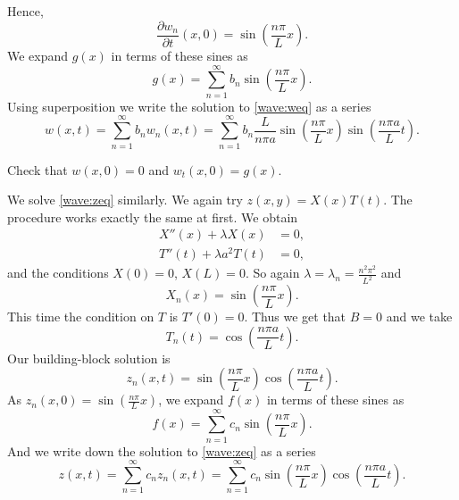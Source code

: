 \documentclass{ximera}
\begin{document}
Hence,
\begin{equation*}
    \frac{\partial w_n}{\partial t}(x,0) = \sin \left( \frac{n \pi}{L} x \right) .
\end{equation*}
We expand $g(x)$ in terms of these sines as
\begin{equation*}
    g(x) = \sum_{n=1}^\infty b_n \sin \left( \frac{n \pi}{L} x \right) .
\end{equation*}
Using superposition we write the solution to \eqref{wave:weq} as a series
\begin{equation*}
    w(x,t) = \sum_{n=1}^\infty b_n w_n(x,t)
    = \sum_{n=1}^\infty b_n \frac{L}{n \pi a} \sin \left( \frac{n \pi}{L} x \right) \sin \left( \frac{n \pi a}{L} t \right) .
\end{equation*}

\begin{exercise}
    Check that $w(x,0) = 0$ and $w_t(x,0) = g(x)$.
\end{exercise}

We solve \eqref{wave:zeq} similarly.  We again try $z(x,y) = X(x)T(t)$.  The procedure works exactly the same at first. We obtain
\begin{align*}
    X''(x) + \lambda X(x) &= 0 , \\
    T''(t) + \lambda a^2 T(t) &= 0 ,
\end{align*}
and the conditions $X(0) = 0$, $X(L) = 0$.  So again $\lambda = \lambda_n = \frac{n^2 \pi^2}{L^2}$ and
\begin{equation*}
    X_n(x) = \sin \left( \frac{n \pi}{L} x \right) .
\end{equation*}
This time the condition on $T$ is $T'(0) = 0$.  Thus  we get that $B = 0$ and we take
\begin{equation*}
    T_n(t) = \cos \left( \frac{n \pi a}{L} t \right).
\end{equation*}
Our building-block solution is
\begin{equation*}
    z_n(x,t) =  \sin \left( \frac{n \pi}{L} x \right) \cos \left( \frac{n \pi a}{L} t \right) .
\end{equation*}
As $z_n(x,0) = \sin \left( \frac{n \pi}{L} x \right)$, we expand $f(x)$ in terms of these sines as
\begin{equation*}
    f(x) = \sum_{n=1}^\infty c_n \sin \left( \frac{n \pi}{L} x \right) .
\end{equation*}
And we write down the solution to \eqref{wave:zeq} as a series
\begin{equation*}
    z(x,t) = \sum_{n=1}^\infty c_n z_n(x,t)
    = \sum_{n=1}^\infty c_n \sin \left( \frac{n \pi}{L} x \right) \cos \left( \frac{n \pi a}{L} t \right) .
\end{equation*}
\end{document}
